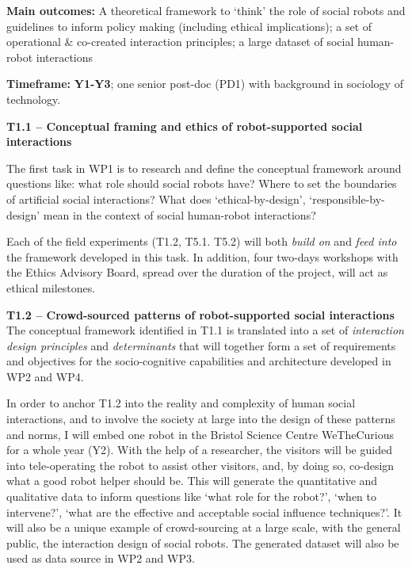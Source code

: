 \begin{framed}
    \textbf{Main outcomes:} A theoretical framework to `think' the role of
    social robots and guidelines to inform policy making (including ethical
    implications); a set of operational \& co-created interaction principles; a
    large dataset of social human-robot interactions

    \textbf{Timeframe:} \textbf{Y1-Y3}; one senior post-doc (PD1)
with background in sociology of technology.
\end{framed}


\textbf{T1.1 -- Conceptual framing and ethics of robot-supported social
interactions}


The first task in WP1 is to research and define the conceptual framework around
questions like: what role should social robots have? Where
to set the boundaries of artificial social interactions? What does
`ethical-by-design', `responsible-by-design' mean in the context of social
human-robot interactions? 

Each of the field experiments (T1.2, T5.1. T5.2) will both \emph{build on} and
\emph{feed into} the framework developed in this task. In addition, four
two-days workshops with the \project Ethics Advisory Board, spread over the
duration of the project, will act as ethical milestones.

\textbf{T1.2 -- Crowd-sourced patterns of robot-supported social
interactions} The conceptual framework identified in T1.1 is translated
into a set of \emph{interaction design principles} and \emph{determinants} that
will together form a set of requirements and objectives for the socio-cognitive
capabilities and architecture developed in WP2 and WP4.

In order to anchor T1.2 into the reality and complexity of human social
interactions, and to involve the society at large into the design of these
patterns and norms, I will embed one \project robot in the Bristol Science
Centre WeTheCurious for a whole year (Y2). With the help of a researcher, the
visitors will be guided into tele-operating the robot to assist other visitors,
and, by doing so, co-design what a good robot helper should be. This will
generate the quantitative and qualitative data to inform questions like `what
role for the robot?', `when to intervene?', `what are the effective and
acceptable social influence techniques?'. It will also be a unique example of
crowd-sourcing at a large scale, with the general public, the interaction design
of social robots.  The generated dataset will also be used as data source in WP2
and WP3.

